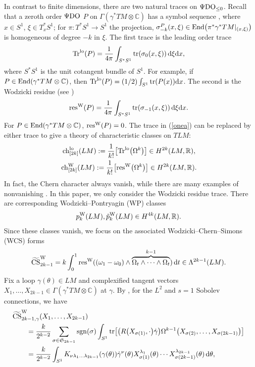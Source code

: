 \documentclass[10pt,a4paper]{amsart}
\numberwithin{equation}{section}
\theoremstyle{definition}
\newcommand{\BbR}{{\mathbb R}}
\newcommand{\BbC}{{\mathbb C}}
\newcommand{\pdo}{\Psi{\rm DO}}
\newcommand{\R}{\BbR}
\newcommand{\C}{\BbC}
\newcommand{\Tr}{{\rm Tr}}
\newcommand{\tr}{{\rm tr}}
\newcommand{\resw}{{\rm res}^{\rm W}}
\newcommand{\ocs}{\widetilde{{\rm CS}}}
\newcommand{\tp}{\tilde p}
\newcommand{\dg}{\dot\gamma}
\begin{document}
In contrast to finite dimensions, there are two natural traces on $\pdo_{\leq 0}$. Recall that a zeroth order $\pdo$
$P$ on $\Gamma(\gamma^*TM\otimes \C)$ has a symbol sequence , where
$x\in S^1$, ${\xi\in T^*_xS^1}$; for $\pi\colon T^*S^1\to S^1$ the projection, $\sigma^P_{-k}(x,\xi)\in {\rm End}\bigl(\pi^*\gamma^*TM|_{(x,\xi)}\bigr)$ is homogeneous of degree $-k$ in $\xi$. The first trace is the leading order trace
\[\Tr^{{\rm lo}}(P) =\frac{1}{4\pi} \int_{S^*S^1} \tr (\sigma_0(x,\xi) )\, {\rm d}\xi{\rm d}x,\]
where $S^*S^1$ is the unit cotangent bundle of $S^1$. For example, if $P\in {\rm End}(\gamma^*TM\otimes \C)$, then
$\Tr^{\rm lo}(P) = (1/2)\int_{S^1} \tr(P(x)) {\rm d}x$. The second
 is the Wodzicki residue (see \cite{fgls})
 \[\resw(P) = \frac{1}{4\pi}\int_{S^*S^1} \tr ( \sigma_{-1}(x,\xi)) \, {\rm d}\xi{\rm d}x.\]
 For $P\in {\rm End}(\gamma^*TM\otimes \C)$, $\resw(P) = 0$. The trace in (\ref{onea}) can be replaced by either trace to give a theory of characteristic classes on $TLM$:
 \begin{gather*}{\rm ch}_{[2k]}^{\rm lo}(LM) := \frac{1}{k!}\bigl[\Tr^{\rm lo}\bigl(\Omega^k\bigr)\bigr]\in H^{2k}(LM,\R), \\
 {\rm ch}_{[2k]}^{\rm W}(LM) := \frac{1}{k!}\bigl[\resw\bigl(\Omega^k\bigr)\bigr]\in H^{2k}(LM,\R).
 \end{gather*}
 In fact, the Chern character  always vanish, while there are many examples of nonvanishing  \cite{lrst}.
 In this paper, we only consider the Wodzicki residue trace.
There are corresponding Wodzicki--Pontryagin (WP) classes
\[p_k^{\rm W}(LM),\tp_k^{\rm W}(LM) \in H^{4k}(LM,\R).\]
Since these classes vanish, we focus on the associated Wodzicki--Chern--Simons (WCS) forms
\[\ocs^{\rm W}_{2k-1} = k
\int_0^1 \resw((\omega_1 - \omega_0)\wedge \overbrace{\Omega_t
\wedge\cdots\wedge\Omega_t}^{k-1}) \, {\rm d}t\in\Lambda^{2k-1}(LM).\]
Fix a loop $\gamma(\theta)\in LM$ and complexified tangent vectors $X_1, \dots,X_{2k-1}\in \Gamma(\gamma^*TM\otimes \C)$ at $\gamma$.
By \cite[equation~(2.9)]{MRT4}, for the $L^2$ and $s=1$ Sobolev connections, we have
 \begin{align}
&\ocs^{\rm W}_{2k-1,\gamma} (X_1,\dots ,X_{2k-1}) \nonumber\\
&\qquad{}=
\frac{k}{2^{k-2}}
\sum_{\sigma\in \mathfrak S_{2k-1}} {\rm sgn}(\sigma) \int_{S^1}\tr\bigl[
 \bigl(R\bigl(X_{\sigma(1)},\cdot\bigr)\dg\bigr)
 \Omega^{k-1}\bigl(X_{\sigma(2)},\dots,X_{\sigma(2k-1)} \bigr)\bigr]\nonumber\\
 &\qquad{}= \frac{k}{2^{k-2}}
\int_{S^1}
 K_{\nu \lambda_1 \dots \lambda_{2k-1}} (\gamma (\theta))
{\dot \gamma}^{\nu} (\theta )
X_{\sigma(1)}^{\lambda_{1}}(\theta ) \cdots X_{ \sigma(2k-1)}^{\lambda_{2k-1}}(\theta)
\, {\rm d}\theta,\label{csg}
\end{align}
\end{document}
